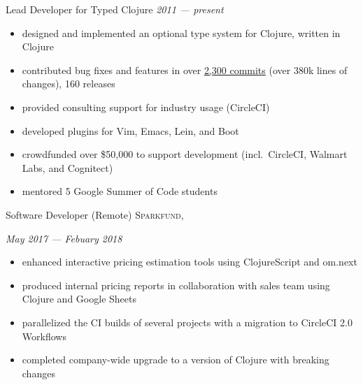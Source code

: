 \documentclass[10pt,a4paper]{article}
\begin{document}




\headedsection
  {Lead Developer for Typed Clojure}
  {\textit{2011 --- present}}
  {
  \begin{itemize}
    \item designed and implemented an optional type system for Clojure, written in Clojure
    \item contributed bug fixes and features in over \href{https://github.com/clojure/core.typed/graphs/contributors}{2,300 commits} (over 380k lines of changes), 160 releases
    \item provided consulting support for industry usage (CircleCI)
    \item developed plugins for Vim, Emacs, Lein, and Boot
    \item crowdfunded over \$50,000 to support development (incl.~CircleCI, Walmart Labs, 
      and Cognitect)
    \item mentored 5 Google Summer of Code students
  \end{itemize}
  }

\headedsection
  {Software Developer (Remote)}
  {\textsc{Sparkfund, }}
  {%
      {\textit{May 2017 --- Febuary 2018}}
      {%
      \begin{itemize}
        \item enhanced interactive pricing estimation tools using ClojureScript and om.next
        \item produced internal pricing reports in collaboration with sales team using Clojure and Google Sheets
        \item parallelized the CI builds of several projects with a migration to CircleCI 2.0 Workflows
        \item completed company-wide upgrade to a version of Clojure with breaking changes
      \end{itemize}
      }%
  }
\end{document}
